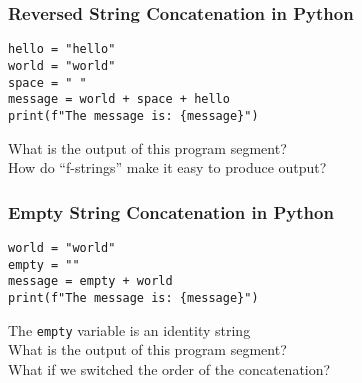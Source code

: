 \documentclass[14pt,aspectratio=169]{beamer}
\begin{document}
%
\begin{frame}[fragile]
  \frametitle{Reversed String Concatenation in Python}
  \begin{minipage}{6in}
    \vspace*{.25in}
    \begin{verbatim}
hello = "hello"
world = "world"
space = " "
message = world + space + hello
print(f"The message is: {message}")
    \end{verbatim}
  \end{minipage}
  \vspace*{.05in}
  \begin{center}
    \normalsize \noindent What is the output of this program segment? \\
    \normalsize \noindent How do ``f-strings'' make it easy to produce output? \\
  \end{center}
\end{frame}

%
\begin{frame}[fragile]
  \frametitle{Empty String Concatenation in Python}
  \begin{minipage}{6in}
    \vspace*{.25in}
    \begin{verbatim}
world = "world"
empty = ""
message = empty + world
print(f"The message is: {message}")
    \end{verbatim}
  \end{minipage}
  \vspace*{.05in}
  \begin{center}
    \normalsize \noindent The {\tt empty} variable is an identity string \\
    \normalsize \noindent What is the output of this program segment? \\
    \normalsize \noindent What if we switched the order of the concatenation? \\
  \end{center}
\end{frame}
\end{document}
